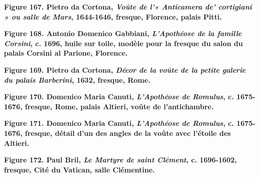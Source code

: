 \documentclass[12pt,twoside,openany]{book}
\begin{document}
\begin{center}
\par\small \textbf{Figure 167. Pietro da Cortona, \textit{Voûte de l’« Anticamera de’ cortigiani » ou salle de Mars}, 1644-1646, fresque, Florence, palais Pitti.}
\end{center}

\begin{center}
\par\small \textbf{Figure 168. Antonio Domenico Gabbiani, \textit{L’Apothéose de la famille Corsini}, c. 1696, huile sur toile, modèle pour la fresque du salon du palais Corsini al Parione, Florence.}
\end{center}

\begin{center}
\par\small \textbf{Figure 169. Pietro da Cortona, \textit{Décor de la voûte de la petite galerie du palais Barberini}, 1632, fresque, Rome.}
\end{center}

\begin{center}
\par\small \textbf{Figure 170. Domenico Maria Canuti, \textit{L’Apothéose de Romulus}, c. 1675-1676, fresque, Rome, palais Altieri, voûte de l’antichambre.}
\end{center}

\begin{center}
\par\small \textbf{Figure 171. Domenico Maria Canuti, \textit{L’Apothéose de Romulus}, c. 1675-1676, fresque, détail d’un des angles de la voûte avec l’étoile des Altieri.}
\end{center}

\begin{center}
\par\small \textbf{Figure 172. Paul Bril, \textit{Le Martyre de saint Clément}, c. 1696-1602, fresque, Cité du Vatican, salle Clémentine.}
\end{center}
\end{document}
